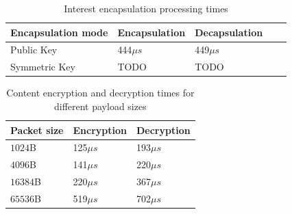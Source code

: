 
\begin{table}[!h]
\centering
\caption{Interest encapsulation processing times}
\label{my-label}
\begin{tabular}{|l|l|l|l|l|}
\hline
Encapsulation mode   & Encapsulation & Decapsulation \\ \hline
Public Key  & 444$\mu s$           & 449$\mu s$           \\ \hline \cline{4-5} 
Symmetric Key & TODO          & TODO          \\ \hline
\end{tabular}
\end{table}



\begin{table}[!h]
\centering
\caption{Content encryption and decryption times for different payload sizes}
\label{my-label}
\begin{tabular}{|l|l|l|}
\hline
Packet size        & Encryption & Decryption \\ \hline
$1024$B & 125$\mu s$        & 193$\mu s$        \\ \hline
$4096$B & 141$\mu s$        & 220$\mu s$        \\ \hline
$16384$B & 220$\mu s$        & 367$\mu s$        \\ \hline
$65536$B & 519$\mu s$        & 702$\mu s$        \\ \hline
\end{tabular}
\end{table}


